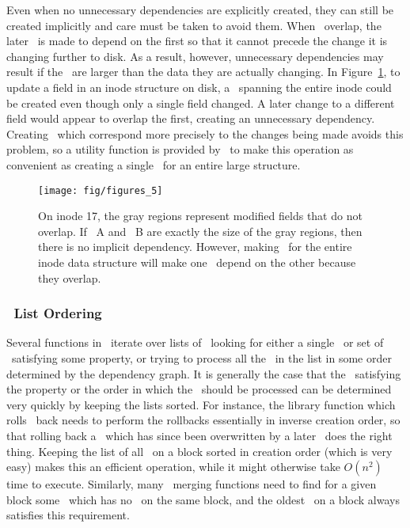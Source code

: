 Even when no unnecessary dependencies are explicitly created, they can still be
created implicitly and care must be taken to avoid them. When \chdescs\ overlap,
the later \chdesc\ is made to depend on the first so that it cannot precede the
change it is changing further to disk. As a result, however, unnecessary
dependencies may result if the \chdescs\ are larger than the data they are
actually changing. In Figure~\ref{fig:overlap}, to update a field in an inode
structure on disk, a \chdesc\ spanning the entire inode could be created even
though only a single field changed. A later change to a different field would
appear to overlap the first, creating an unnecessary dependency. Creating
\chdescs\ which correspond more precisely to the changes being made avoids this
problem, so a utility function is provided by \Kudos\ to make this operation as
convenient as creating a single \chdesc\ for an entire large structure.

\begin{figure}[htb]
  \centering
  \texttt{[image: fig/figures\_5]}
  \caption{\label{fig:overlap} On inode 17, the gray regions represent
  modified fields that do not overlap. If \chdesc\ A and \chdesc\ B are
  exactly the size of the gray regions, then there is no implicit dependency.
  However, making \chdescs\ for the entire inode data structure will make
  one \chdesc\ depend on the other because they overlap.}
\end{figure}

\subsubsection{\ChDesc\ List Ordering}
Several functions in \Kudos\ iterate over lists of \chdescs\ looking for either
a single \chdesc\ or set of \chdescs\ satisfying some property, or trying to
process all the \chdescs\ in the list in some order determined by the dependency
graph. It is generally the case that the \chdescs\ satisfying the property or
the order in which the \chdescs\ should be processed can be determined very
quickly by keeping the lists sorted. For instance, the library function which
rolls \chdescs\ back needs to perform the rollbacks essentially in inverse
creation order, so that rolling back a \chdesc\ which has since been overwritten
by a later \chdesc\ does the right thing. Keeping the list of all \chdescs\ on a
block sorted in creation order (which is very easy) makes this an efficient
operation, while it might otherwise take $O(n^2)$ time to execute. Similarly,
many \chdesc\ merging functions need to find for a given block some \chdesc\
which has no \befores\ on the same block, and the oldest \chdesc\ on a block
always satisfies this requirement.
